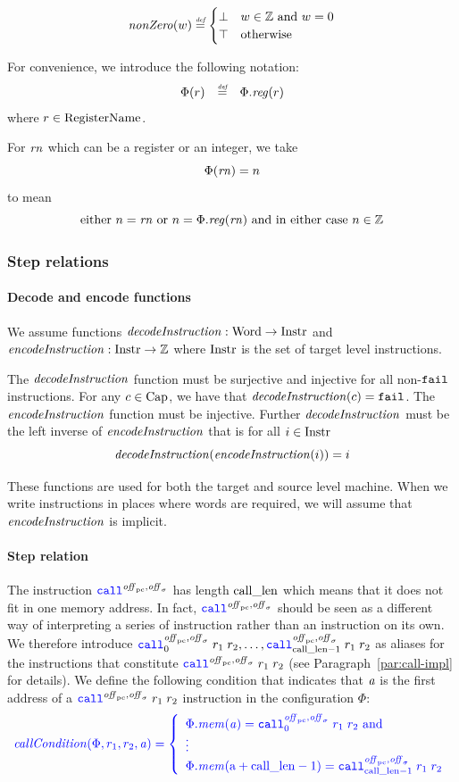 \documentclass[a4paper]{article}
\begin{document}
\[
  \nonZero{w} \defeq
  \begin{cases}
    \bot & w \in \ints \tand w = 0 \\
    \top & \totherwise
  \end{cases}
\]


For convenience, we introduce the following notation:
\[
  \begin{array}{rcl}
    \Phi(r) & \defeq & \Phi.\reg(r)
  \end{array}
\]
where $r\in \mathrm{RegisterName}$.

For $\mathit{rn}$ which can be a register or an integer, we take
\[
  \Phi(\mathit{rn}) = n
\]
to mean
\[
  \text{either $n = \rn$ or $n = \Phi.\reg(\rn)$ and in either case $n \in \ints$}
\]


\subsubsection{Step relations}
\paragraph{Decode and encode functions}
We assume functions $\decInstr{} : \Word \fun \Instr$ and $\encInstr{} : \Instr \fun \ints$ where $\mathrm{Instr}$ is the set of target level instructions.

The $\decInstr{}$ function must be surjective and injective for all non-$\texttt{{\color{black} fail}}$ instructions.
For any $c \in \mathrm{Cap}$, we have that $\decInstr{c} = \tfail$.
The $\encInstr{}$ function must be injective.
Further $\decInstr{}$ must be the left inverse of $\encInstr{}$ that is for all $i \in \mathrm{Instr}$
\[
  \decInstr{}(\encInstr{i}) = i
\]

These functions are used for both the target and source level machine. When we write instructions in places where words are required, we will assume that $\encInstr{}$ is implicit.

\paragraph{Step relation}
The instruction $\scall{\offpc,\offsigma}{}{}$ has length $\mathrm{call\_len}$ which means that it does not fit in one memory address. In fact, $\scall{\offpc,\offsigma}{}{}$ should be seen as a different way of interpreting a series of instruction rather than an instruction on its own. We therefore introduce $\scall[0]{\offpc,\offsigma}{r_1}{r_2},\dots,\scall[\calllen-1]{\offpc,\offsigma}{r_1}{r_2}$ as aliases for the instructions that constitute $\scall{\offpc,\offsigma}{r_1}{r_2}$ (see Paragraph~\ref{par:call-impl} for details). We define the following condition that indicates that $\mathit{a}$ is the first address of a $\scall{\offpc,\offsigma}{r_1}{r_2}$ instruction in the configuration $\Phi$:
\[
  \sourcecolor\left.
    \callCond{\Phi,r_1,r_2,\aaddr} = \left\{
      \begin{array}{l}
        \Phi.\mem(\aaddr) = \scall[0]{\offpc,\offsigma}{r_1}{r_2} \tand\\
        \vdots \\
        \Phi.\mem(\addr+\calllen-1) = \scall[\calllen-1]{\offpc,\offsigma}{r_1}{r_2}
      \end{array}
      \right.
  \right.
\]
\end{document}
